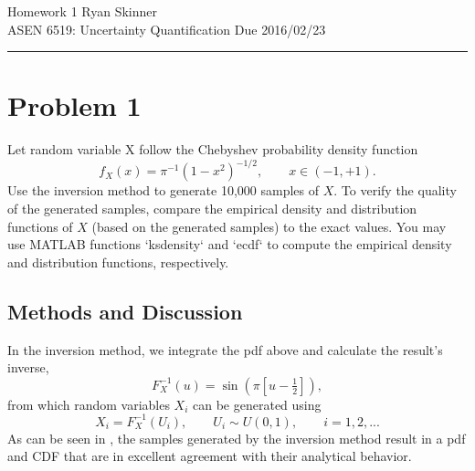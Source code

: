 \documentclass[11pt]{article}
\begin{document}
\newcommand{\widesim}[2][1.5]{
  \mathrel{\overset{#2}{\scalebox{#1}[1]{$\sim$}}}
}

\renewcommand*{\arraystretch}{1.5}

\pagestyle{fancyplain}
\lhead{}
\chead{}
\rhead{}
\cfoot{\hrule \thepage}

\noindent
{\Large Homework 1}
\hfill
{\large Ryan Skinner}
\\[0.5ex]
{\large ASEN 6519: Uncertainty Quantification}
\hfill
{\large Due 2016/02/23}\\
\hrule
\vspace{6pt}

\section*{Problem 1} %

Let random variable X follow the Chebyshev probability density function
\begin{equation}
f_X(x) = \pi^{-1} (1 - x^2)^{-1/2}, \qquad x \in (-1, +1).
\end{equation}
Use the inversion method to generate 10,000 samples of $X$. To verify the quality of the generated samples, compare the empirical density and distribution functions of $X$ (based on the generated samples) to the exact values. You may use MATLAB functions `ksdensity` and `ecdf` to compute the empirical density and distribution functions, respectively.

\subsection*{Methods and Discussion}

In the inversion method, we integrate the pdf above and calculate the result's inverse,
\begin{equation}
F_X^{-1}(u) = \sin \left( \pi \left[ u - \tfrac{1}{2} \right] \right)
,
\end{equation}
from which random variables $X_i$ can be generated using
\begin{equation}
X_i = F_X^{-1}(U_i), \qquad U_i \sim U(0,1), \qquad i = 1, 2, ...
\end{equation}
As can be seen in , the samples generated by the inversion method result in a pdf and CDF that are in excellent agreement with their analytical behavior.
\end{document}
